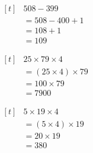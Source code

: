 \documentclass[UTF8]{ctexart}
\newcommand{\cell}[1]{%
  \begin{minipage}[t][49mm][t]{0.315\textwidth}%
    \vspace{0pt}%
    \linespread{1}\zihao{3}%
    #1%
  \end{minipage}%
}
\newcommand{\sheetrow}[3]{%
  \noindent\cell{#1}\hfill\cell{#2}\hfill\cell{#3}\par
  \nointerlineskip
}
\begin{document}
\sheetrow
{\(\begin{aligned}[t]
& 508-399 \\
& = 508-400+1 \\
& = 108+1 \\
& = 109
\end{aligned}\)}
{\(\begin{aligned}[t]
& 25\times 79\times 4 \\
& = (25\times 4)\times 79 \\
& = 100\times 79 \\
& = 7900
\end{aligned}\)}
{\(\begin{aligned}[t]
& 5\times 19\times 4 \\
& = (5\times 4)\times 19 \\
& = 20\times 19 \\
& = 380
\end{aligned}\)}

\newpage
\end{document}
